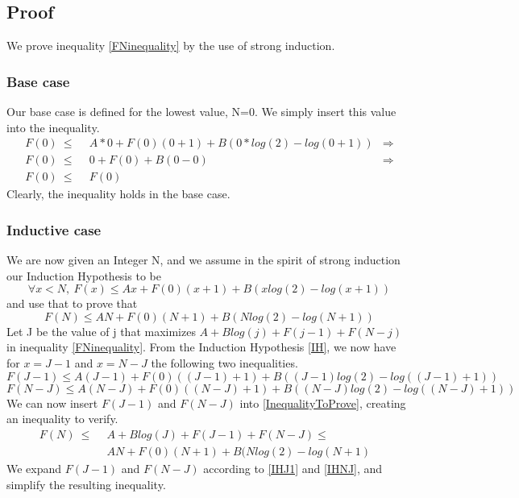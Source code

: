 \subsection{Proof}
We prove inequality \ref{FNinequality} by the use of strong induction.
\subsubsection{Base case}
Our base case is defined for the lowest value, N=0. We simply insert this value into the inequality.
\begin{align*}
F(0)\ \le&\ \  A*0 + F(0)(0+1) + B(0*log(2)-log(0+1)) & \Rightarrow \\
F(0)\ \le&\ \  0 + F(0) + B(0-0) & \Rightarrow \\
F(0)\ \le&\ \  F(0) &
\end{align*}
Clearly, the inequality holds in the base case.

\subsubsection{Inductive case}
We are now given an Integer N, and we assume in the spirit of strong induction our Induction Hypothesis to be
\begin{equation}
\forall x < N,\ F(x) \le Ax + F(0)(x+1) + B(xlog(2)-log(x+1))
\label{IH}	
\end{equation}
and use that to prove that 
\begin{equation}
F(N) \le AN + F(0)(N+1) + B(Nlog(2)-log(N+1))
\label{InequalityToProve} 	
\end{equation}
Let J be the value of j that maximizes $A + Blog(j) + F(j-1) + F(N-j)$ in inequality \ref{FNinequality}. From the Induction Hypothesis \ref{IH}, we now have for $x=J-1$ and $x=N-J$ the following two inequalities.
\begin{equation}
F(J-1) \le A(J-1) + F(0)((J-1)+1) + B((J-1)log(2)-log((J-1)+1))
\label{IHJ1} 	
\end{equation}
\begin{equation}
F(N-J) \le A(N-J) + F(0)((N-J)+1) + B((N-J)log(2)-log((N-J)+1))
\label{IHNJ} 	
\end{equation}
We can now insert $F(J-1)$ and $F(N-J)$ into \ref{InequalityToProve}, creating an inequality to verify.
\begin{align*}
F(N)\ \le&\ \  A + Blog(J) + F(J-1) + F(N-J) \le   & \\
&\ \  AN + F(0)(N+1) + B(Nlog(2)-log(N+1) & 
\end{align*}
We expand $F(J-1)$ and $F(N-J)$ according to \ref{IHJ1} and \ref{IHNJ}, and simplify the resulting inequality.

